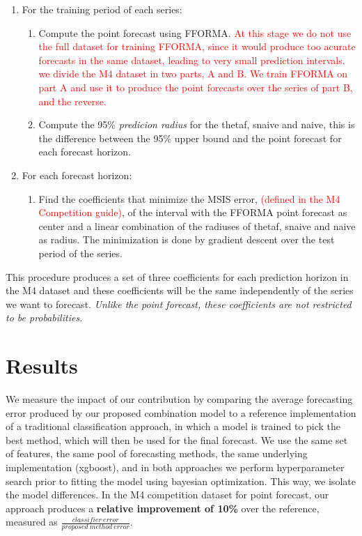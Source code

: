 \documentclass[11pt,a4paper,]{article}
\providecommand{\tightlist}{%
  \setlength{\itemsep}{0pt}\setlength{\parskip}{0pt}}
\theoremstyle{definition}
\theoremstyle{definition}
\theoremstyle{definition}
\theoremstyle{remark}
\begin{document}
\begin{enumerate}
\def\labelenumi{\arabic{enumi}.}
\tightlist
\item
  For the training period of each series:

  \begin{enumerate}
  \def\labelenumii{\arabic{enumii}.}
  \tightlist
  \item
    Compute the point forecast using FFORMA.
    \textcolor{red}{At this stage we do not use the full dataset for training FFORMA, since it would produce too acurate forecasts in the same dataset, leading to very small prediction intervals. we divide the M4 dataset in two parts, A and B. We train FFORMA on part A and use it to produce the point forecasts over the series of part B, and the reverse.}
  \item
    Compute the 95\% \emph{predicion radius} for the thetaf, snaive and
    naive, this is the difference between the 95\% upper bound and the
    point forecast for each forecast horizon.
  \end{enumerate}
\item
  For each forecast horizon:

  \begin{enumerate}
  \def\labelenumii{\arabic{enumii}.}
  \tightlist
  \item
    Find the coefficients that minimize the MSIS error,
    \textcolor{red}{(defined in the M4 Competition guide)}, of the
    interval with the FFORMA point forecast as center and a linear
    combination of the radiuses of thetaf, snaive and naive as radius.
    The minimization is done by gradient descent over the test period of
    the series.
  \end{enumerate}
\end{enumerate}

This procedure produces a set of three coefficients for each prediction
horizon in the M4 dataset and these coefficients will be the same
independently of the series we want to forecast. \emph{Unlike the point
forecast, these coefficients are not restricted to be probabilities.}

\section{Results}\label{results}

We measure the impact of our contribution by comparing the average
forecasting error produced by our proposed combination model to a
reference implementation of a traditional classification approach, in
which a model is trained to pick the best method, which will then be
used for the final forecast. We use the same set of features, the same
pool of forecasting methods, the same underlying implementation
(xgboost), and in both approaches we perform hyperparameter search prior
to fitting the model using bayesian optimization. This way, we isolate
the model differences. In the M4 competition dataset for point forecast,
our approach produces a \textbf{relative improvement of 10\%} over the
reference, measured as
\(\frac{classifier\ error}{proposed\ method\ error}\).
\end{document}
